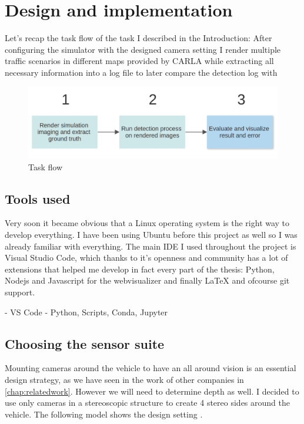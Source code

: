 \chapter{Design and implementation}
\label{chap:designimplementation}

Let's recap the task flow of the task I described in the Introduction: After
configuring the simulator with the designed camera setting I render multiple
traffic scenarios in different maps provided by CARLA while extracting all
necessary information into a log file to later compare the detection log with


\begin{figure}[!ht]
    \centering
    \includegraphics[width=150mm, keepaspectratio]{figures/flowchart.png}
    \caption{Task flow}
    \label{fig:flow2}
\end{figure}


\section{Tools used}

Very soon it became obvious that a Linux operating system is the right way to
develop everything. I have been using Ubuntu before this project as well so I
was already familiar with everything. The main IDE I used throughout the project
is Visual Studio Code, which thanks to it's openness and community has a lot of
extensions that helped me develop in fact every part of the thesis: Python,
Nodejs and Javascript for the webvisualizer and finally LaTeX and ofcourse git
support.

- VS Code
- Python, Scripts, Conda, Jupyter

\section{Choosing the sensor suite}

Mounting cameras around the vehicle to have an all around vision is an essential
design strategy, as we have seen in the work of other companies in
\autoref{chap:relatedwork}. However we will need to determine depth as well. I
decided to use only cameras in a stereoscopic structure to create 4 stereo sides
around the vehicle. The following model shows the design setting .

